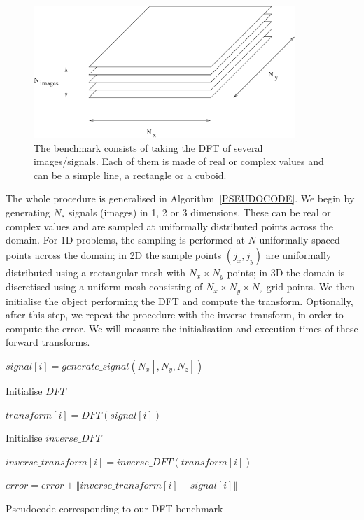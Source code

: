 \documentclass[12pt, a4paper]{article} \setlength{\textheight}{24cm}
\begin{document}
\begin{figure}[H]
  \centering
  \includegraphics[height=5cm]{benchmark.pdf}
  \caption{The benchmark consists of taking the DFT of several
    images/signals. Each of them is made of real or complex values and
    can be a simple line, a rectangle or a cuboid.}
  \label{benchmark}
\end{figure}

The whole procedure is generalised in Algorithm~\ref{PSEUDOCODE}. We
begin by generating $N_s$ signals (images) in 1, 2 or 3 dimensions.
These can be real or complex values and are sampled at uniformally
distributed points across the domain. For 1D problems, the sampling is
performed at $N$ uniformally spaced points across the domain; in 2D
the sample points $(j_x,j_y)$ are uniformally distributed using a
rectangular mesh with $N_x\times N_y$ points; in 3D the domain is
discretised using a uniform mesh consisting of $N_x\times N_y\times
N_z$ grid points. We then initialise the object performing the DFT and
compute the transform. Optionally, after this step, we repeat the procedure with
the inverse transform, in order to compute the error. We will measure
the initialisation and execution times of these forward transforms.
\begin{algorithm}[H]
  \centering
  \begin{algorithmic}
     \STATE
    $signal[i]=generate\_signal(N_x [,N_y, N_z])$
    \ENDFOR

    \STATE Initialise $DFT$

     \STATE $transform[i]=DFT(signal[i])$
    \ENDFOR

    \STATE Initialise $inverse\_DFT$

      \STATE
    $inverse\_transform[i]=inverse\_DFT(transform[i])$
    \ENDFOR

     \STATE $error=error+\left\Vert
      inverse\_transform[i]-signal[i]\right\Vert$
    \ENDFOR
   \ENDIF
  \end{algorithmic}
  \caption{Pseudocode corresponding to our DFT benchmark}
  \label{PSEUDOCODE}
\end{algorithm}
\end{document}
